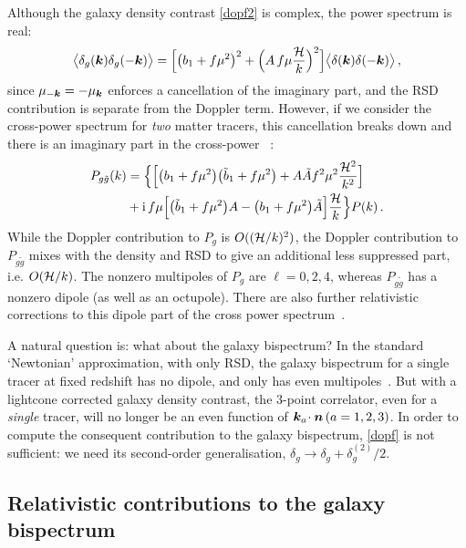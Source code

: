 Although the galaxy density contrast \eqref{dopf2} is complex, the power spectrum is real:
\begin{equation}
\big\langle \delta_g(\bm {k})\delta_g(-\bm {k})\big\rangle
=\Big[ \big(b_{1} + f\mu^{2}\big)^2+\Big(A\,f \mu \frac{\mathcal{H}}{k}\Big)^2\Big] \big\langle \delta(\bm {k})\delta(-\bm {k})\big\rangle \,,\nonumber
\end{equation}
since $\mu_{-\bm {k}}=-\mu_{\bm {k}}$ enforces a cancellation of the imaginary part, and the RSD contribution is separate from the Doppler term.
  However, if we consider the cross-power spectrum for {\em two} matter tracers, this cancellation breaks down
and  there is an imaginary part in the cross-power~ \citep{McDonald:2009dh,Bonvin:2014owa}:
\begin{align}
P_{g \tilde g}(k)&= \Big\{\Big[ \big(b_{1} + f\mu^{2}\big)\big(\tilde b_{1} + f\mu^{2}\big)+A\tilde A f^2\mu^2 {\frac{\mathcal{H}^2}{k^2}}\Big]\nonumber\\
&
+\mathrm{i\,} f\mu\Big[\big(\tilde b_{1} + f\mu^{2}\big)A-\big(b_{1} + f\mu^{2}\big)\tilde A\Big]{\frac{\mathcal{H}}{k}} \Big\}P(k) \,.\nonumber
\end{align}
While the Doppler contribution to $P_g$ is $O((\mathcal{H}/k)^{2})$,  the Doppler contribution to $P_{g\tilde g}$ mixes with the density and RSD to give an additional less suppressed part, i.e. $O(\mathcal{H}/k)$. The nonzero multipoles of $P_g$ are $\ell=0,2,4$, whereas  $P_{g \tilde g}$ has a nonzero dipole (as well as an octupole).  There are also further relativistic corrections to this dipole part of the cross power spectrum~\citep{DiDio:2018zmk}.


A natural question is: what about the galaxy bispectrum? In the standard `Newtonian' approximation, with only RSD, the galaxy bispectrum for a single tracer at fixed redshift has no dipole, and only has even multipoles~\citep{Scoccimarro:1999ed,Nan:2017oaq}. But
with a lightcone corrected galaxy density contrast, the 3-point correlator, even for a {\em single} tracer, will no longer be an even function of $\bm {k}_a\!\cdot\bm {n} \,(a=1,2,3)$. In order to compute the consequent contribution to the galaxy bispectrum, \eqref{dopf} is not sufficient: we need its second-order generalisation, $\delta_g \to \delta_g+\delta^{(2)}_g/2$.

\subsection*{Relativistic contributions to the galaxy bispectrum}

